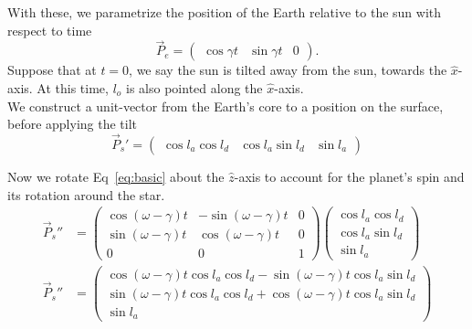 \documentclass[12pt,a4paper]{article}
\begin{document}
With these, we parametrize the position of the Earth relative to the sun with respect to time 
\begin{equation}\label{eq:sun_earth}
\vec{P}_{e} = \left( \begin{array}{ccc} \cos\gamma t & \sin\gamma t & 0 \end{array}\right).
\end{equation}
Suppose that at \(t=0\), we say the sun is tilted away from the sun, towards the \(\hat{x}\)-axis. At this time, \(l_{o}\) is also pointed along the \(\hat{x}\)-axis. \\

We construct a unit-vector from the Earth's core to a position on the surface, before applying the tilt
\begin{equation}\label{eq:basic}
\vec{P}_{s}' = \left(\begin{array}{ccc}\cos l_{a}\cos l_{d} & \cos l_{a}\sin l_{d} & \sin l_{a} \end{array}\right)
\end{equation}

Now we rotate Eq~\eqref{eq:basic} about the \(\hat{z}\)-axis to account for the planet's spin and its rotation around the star.
\begin{align}
\vec{P}_{s}'' &=\left(\begin{array}{ccc} \cos(\omega - \gamma)t & -\sin(\omega - \gamma) t & 0 \\ \sin(\omega - \gamma) t & \cos(\omega - \gamma) t & 0 \\ 0 & 0 & 1 \end{array} \right) \left(\begin{array}{c}\cos l_{a}\cos l_{d} \\ \cos l_{a}\sin l_{d} \\ \sin l_{a} \end{array}\right) \\
\vec{P}_{s}'' &=  \left(\begin{array}{c} \cos(\omega-\gamma)t\cos l_{a}\cos l_{d} - \sin(\omega-\gamma)t\cos l_{a}\sin l_{d} \\ \sin(\omega - \gamma)t\cos l_{a}\cos l_{d} + \cos(\omega-\gamma)t\cos l_{a}\sin l_{d} \\ \sin l_{a} \end{array}\right) \label{eq:rotated}
\end{align}
\end{document}
